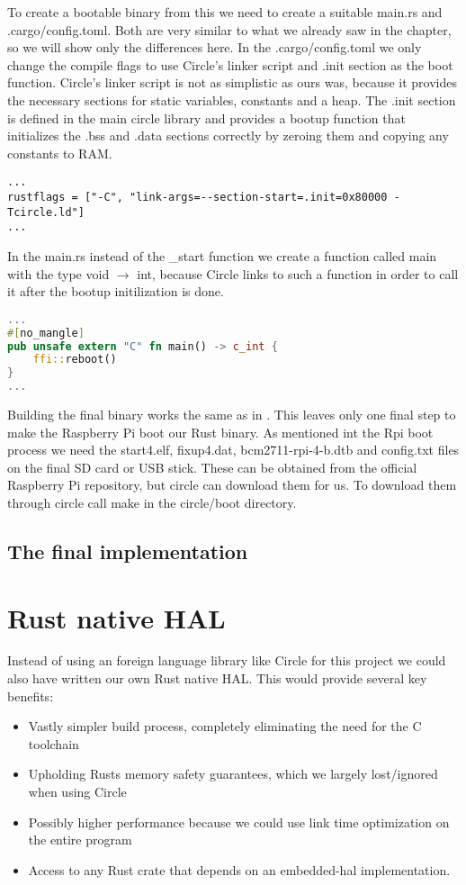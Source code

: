 To create a bootable binary from this we need to create a suitable main.rs and .cargo/config.toml.
Both are very similar to what we already saw in the  chapter, so we will show only the differences here.
In the .cargo/config.toml we only change the compile flags to use Circle's linker script and .init section as the boot function.
Circle's linker script is not as simplistic as ours was, because it provides the necessary sections for static variables, constants and a heap.
The .init section is defined in the main circle library and provides a bootup function that initializes the .bss and .data sections correctly by zeroing them and copying any constants to RAM.
\begin{verbatim}
...
rustflags = ["-C", "link-args=--section-start=.init=0x80000 -Tcircle.ld"]
...
\end{verbatim}

In the main.rs instead of the \_start function we create a function called main with the type void $\rightarrow$ int,
because Circle links to such a function in order to call it after the bootup initilization is done.
\begin{lstlisting}[language=Rust,style=colouredRust]
...
#[no_mangle]
pub unsafe extern "C" fn main() -> c_int {
    ffi::reboot()
}
...
\end{lstlisting}

Building the final binary works the same as in .
This leaves only one final step to make the Raspberry Pi boot our Rust binary.
As mentioned int the Rpi boot process we need the start4.elf, fixup4.dat, bcm2711-rpi-4-b.dtb and config.txt files on the final SD card or USB stick.
These can be obtained from the official Raspberry Pi repository, but circle can download them for us.
To download them through circle call make in the circle/boot directory.

\subsection{The final implementation}

\section{Rust native HAL}
\label{sec:concept_and_implementation:hal}

Instead of using an foreign language library like Circle for this project we could also have written our own Rust native HAL.
This would provide several key benefits:
\begin{itemize}
    \item Vastly simpler build process, completely eliminating the need for the C toolchain
    \item Upholding Rusts memory safety guarantees, which we largely lost/ignored when using Circle
    \item Possibly higher performance because we could use link time optimization on the entire program
    \item Access to any Rust crate that depends on an embedded-hal implementation.
\end{itemize}

